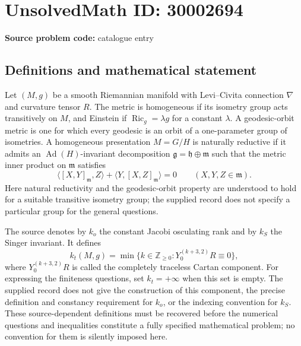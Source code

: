 \documentclass[11pt]{article}
\newcommand{\Z}{\mathbb{Z}}
\begin{document}
\section*{UnsolvedMath ID: 30002694}
\textbf{Source problem code:} catalogue entry
\subsection{Definitions and mathematical statement}
Let \((M,g)\) be a smooth Riemannian manifold with Levi--Civita connection \(\nabla\) and curvature tensor \(R\). The metric is homogeneous if its isometry group acts transitively on \(M\), and Einstein if \(\operatorname{Ric}_g=\lambda g\) for a constant \(\lambda\). A geodesic-orbit metric is one for which every geodesic is an orbit of a one-parameter group of isometries. A homogeneous presentation \(M=G/H\) is naturally reductive if it admits an \(\operatorname{Ad}(H)\)-invariant decomposition \(\mathfrak g=\mathfrak h\oplus\mathfrak m\) such that the metric inner product on \(\mathfrak m\) satisfies
\[
\langle [X,Y]_{\mathfrak m},Z\rangle+\langle Y,[X,Z]_{\mathfrak m}\rangle=0
\qquad(X,Y,Z\in\mathfrak m).
\]
Here natural reductivity and the geodesic-orbit property are understood to hold for a suitable transitive isometry group; the supplied record does not specify a particular group for the general questions.

The source denotes by \(k_o\) the constant Jacobi osculating rank and by \(k_S\) the Singer invariant. It defines
\[
 k_t(M,g)=\min\bigl\{k\in\Z_{\geq0}:Y_0^{(k+3,2)}R\equiv0\bigr\},
\]
where \(Y_0^{(k+3,2)}R\) is called the completely traceless Cartan component. For expressing the finiteness questions, set \(k_t=+\infty\) when this set is empty. The supplied record does not give the construction of this component, the precise definition and constancy requirement for \(k_o\), or the indexing convention for \(k_S\). These source-dependent definitions must be recovered before the numerical questions and inequalities constitute a fully specified mathematical problem; no convention for them is silently imposed here.
\end{document}

